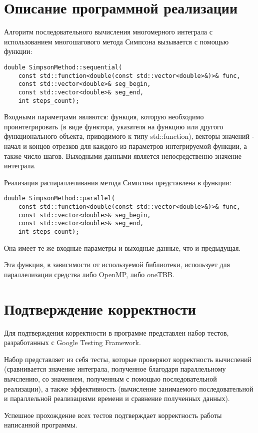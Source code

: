 \documentclass{report}
\begin{document}
\section*{Описание программной реализации}
Алгоритм последовательного вычисления многомерного интеграла с использованием многошагового метода Симпсона вызывается с помощью функции:
\begin{lstlisting}
double SimpsonMethod::sequential(
    const std::function<double(const std::vector<double>&)>& func,
    const std::vector<double>& seg_begin,
    const std::vector<double>& seg_end,
    int steps_count);
\end{lstlisting}
\par Входными параметрами являются: функция, которую необходимо проинтегрировать (в виде функтора, указателя на функцию или другого функционального объекта, приводимого к типу std::function), векторы значений - начал и концов отрезков для каждого из параметров интегрируемой функции, а также число шагов. Выходными данными является непосредственно значение интеграла.
\par Реализация распараллеливания метода Симпсона представлена в функции:
\begin{lstlisting}
double SimpsonMethod::parallel(
    const std::function<double(const std::vector<double>&)>& func,
    const std::vector<double>& seg_begin,
    const std::vector<double>& seg_end,
    int steps_count);
\end{lstlisting}
\par Она имеет те же входные параметры и выходные данные, что и предыдущая.
\par Эта функция, в зависимости от используемой библиотеки, использует для параллелизации средства либо OpenMP, либо oneTBB.
\newpage

\section*{Подтверждение корректности}
Для подтверждения корректности в программе представлен набор тестов, разработанных с Google Testing Framework.
\par Набор представляет из себя тесты, которые проверяют корректность вычислений (сравнивается значение интеграла, полученное благодаря параллельному вычслению, со значением, полученным с помощью последовательной реализации), а также эффективность (вычисление занимаемого последовательной и параллельной реализациями времени и сравнение полученных данных).
\par Успешное прохождение всех тестов подтверждает корректность работы написанной программы.
\newpage
\end{document}
